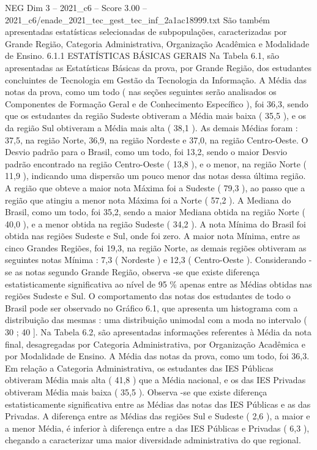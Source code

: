 \begin{textsample}{NEG Dim 3 – 2021\_c6 – Score 3.00 – 2021\_c6/enade\_2021\_tec\_gest\_tec\_inf\_2a1ac18999.txt}
São também apresentadas estatísticas selecionadas de subpopulações, caracterizadas por Grande Região, Categoria Administrativa, Organização Acadêmica e Modalidade de Ensino. 6.1.1 ESTATÍSTICAS BÁSICAS GERAIS Na Tabela 6.1, são apresentadas as Estatísticas Básicas da prova, por Grande Região, dos estudantes concluintes de Tecnologia em Gestão da Tecnologia da Informação.
A Média das notas da prova, como um todo ( nas seções seguintes serão analisados os Componentes de Formação Geral e de Conhecimento Específico ), foi 36,3, sendo que os estudantes da região Sudeste obtiveram a Média mais baixa ( 35,5 ), e os da região Sul obtiveram a Média mais alta ( 38,1 ).
As demais Médias foram : 37,5, na região Norte, 36,9, na região Nordeste e 37,0, na região Centro-Oeste.
O Desvio padrão para o Brasil, como um todo, foi 13,2, sendo o maior Desvio padrão encontrado na região Centro-Oeste ( 13,8 ), e o menor, na região Norte ( 11,9 ), indicando uma dispersão um pouco menor das notas dessa última região.
A região que obteve a maior nota Máxima foi a Sudeste ( 79,3 ), ao passo que a região que atingiu a menor nota Máxima foi a Norte ( 57,2 ).
A Mediana do Brasil, como um todo, foi 35,2, sendo a maior Mediana obtida na região Norte ( 40,0 ), e a menor obtida na região Sudeste ( 34,2 ).
A nota Mínima do Brasil foi obtida nas regiões Sudeste e Sul, onde foi zero.
A maior nota Mínima, entre as cinco Grandes Regiões, foi 19,3, na região Norte, as demais regiões obtiveram as seguintes notas Mínima : 7,3 ( Nordeste ) e 12,3 ( Centro-Oeste ).
Considerando -se as notas segundo Grande Região, observa -se que existe diferença estatisticamente significativa ao nível de 95 \% apenas entre as Médias obtidas nas regiões Sudeste e Sul.
O comportamento das notas dos estudantes de todo o Brasil pode ser observado no Gráfico 6.1, que apresenta um histograma com a distribuição das mesmas : uma distribuição unimodal com a moda no intervalo ( 30 ; 40 ].
Na Tabela 6.2, são apresentadas informações referentes à Média da nota final, desagregadas por Categoria Administrativa, por Organização Acadêmica e por Modalidade de Ensino.
A Média das notas da prova, como um todo, foi 36,3.
Em relação a Categoria Administrativa, os estudantes das IES Públicas obtiveram Média mais alta ( 41,8 ) que a Média nacional, e os das IES Privadas obtiveram Média mais baixa ( 35,5 ).
Observa -se que existe diferença estatisticamente significativa entre as Médias das notas das IES Públicas e as das Privadas.
A diferença entre as Médias das regiões Sul e Sudeste ( 2,6 ), a maior e a menor Média, é inferior à diferença entre a das IES Públicas e Privadas ( 6,3 ), chegando a caracterizar uma maior diversidade administrativa do que regional.

\end{textsample}
